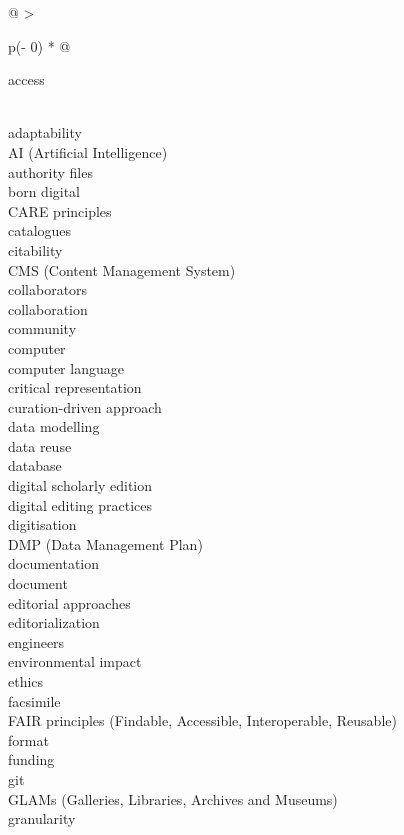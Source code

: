 \documentclass[
  letterpaper,
  DIV=11,
  numbers=noendperiod]{scrreprt}
\begin{document}
\begin{longtable}[]{@{}
  >{\raggedright\arraybackslash}p{(\columnwidth - 0\tabcolsep) * }@{}}
\toprule\noalign{}
\begin{minipage}[b]{\linewidth}\raggedright
access
\end{minipage} \\
\midrule\noalign{}
\endhead
\bottomrule\noalign{}
\endlastfoot
adaptability \\
AI (Artificial Intelligence) \\
authority files \\
born digital \\
CARE principles \\
catalogues \\
citability \\
CMS (Content Management System) \\
collaborators \\
collaboration \\
community \\
computer \\
computer language \\
critical representation \\
curation-driven approach \\
data modelling \\
data reuse \\
database \\
digital scholarly edition \\
digital editing practices \\
digitisation \\
DMP (Data Management Plan) \\
documentation \\
document \\
editorial approaches \\
editorialization \\
engineers \\
environmental impact \\
ethics \\
facsimile \\
FAIR principles (Findable, Accessible, Interoperable, Reusable) \\
format \\
funding \\
git \\
GLAMs (Galleries, Libraries, Archives and Museums) \\
granularity \\

\end{longtable}
\end{document}
